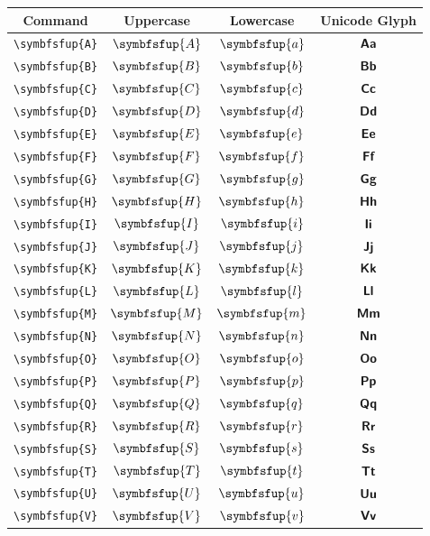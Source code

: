 \documentclass[12pt,a4paper]{article}
\begin{document}
\begin{longtable}{|c|c|c|c|}
\hline
\textbf{Command} & \textbf{Uppercase} & \textbf{Lowercase} & \textbf{Unicode Glyph} \\
\hline
\verb|\symbfsfup{A}| & $\symbfsfup{A}$ & $\symbfsfup{a}$ & $ 𝗔 𝗮 $ \\
\verb|\symbfsfup{B}| & $\symbfsfup{B}$ & $\symbfsfup{b}$ & $ 𝗕 𝗯 $ \\
\verb|\symbfsfup{C}| & $\symbfsfup{C}$ & $\symbfsfup{c}$ & $ 𝗖 𝗰 $ \\
\verb|\symbfsfup{D}| & $\symbfsfup{D}$ & $\symbfsfup{d}$ & $ 𝗗 𝗱 $ \\
\verb|\symbfsfup{E}| & $\symbfsfup{E}$ & $\symbfsfup{e}$ & $ 𝗘 𝗲 $ \\
\verb|\symbfsfup{F}| & $\symbfsfup{F}$ & $\symbfsfup{f}$ & $ 𝗙 𝗳 $ \\
\verb|\symbfsfup{G}| & $\symbfsfup{G}$ & $\symbfsfup{g}$ & $ 𝗚 𝗴 $ \\
\verb|\symbfsfup{H}| & $\symbfsfup{H}$ & $\symbfsfup{h}$ & $ 𝗛 𝗵 $ \\
\verb|\symbfsfup{I}| & $\symbfsfup{I}$ & $\symbfsfup{i}$ & $ 𝗜 𝗶 $ \\
\verb|\symbfsfup{J}| & $\symbfsfup{J}$ & $\symbfsfup{j}$ & $ 𝗝 𝗷 $ \\
\verb|\symbfsfup{K}| & $\symbfsfup{K}$ & $\symbfsfup{k}$ & $ 𝗞 𝗸 $ \\
\verb|\symbfsfup{L}| & $\symbfsfup{L}$ & $\symbfsfup{l}$ & $ 𝗟 𝗹 $ \\
\verb|\symbfsfup{M}| & $\symbfsfup{M}$ & $\symbfsfup{m}$ & $ 𝗠 𝗺 $ \\
\verb|\symbfsfup{N}| & $\symbfsfup{N}$ & $\symbfsfup{n}$ & $ 𝗡 𝗻 $ \\
\verb|\symbfsfup{O}| & $\symbfsfup{O}$ & $\symbfsfup{o}$ & $ 𝗢 𝗼 $ \\
\verb|\symbfsfup{P}| & $\symbfsfup{P}$ & $\symbfsfup{p}$ & $ 𝗣 𝗽 $ \\
\verb|\symbfsfup{Q}| & $\symbfsfup{Q}$ & $\symbfsfup{q}$ & $ 𝗤 𝗾 $ \\
\verb|\symbfsfup{R}| & $\symbfsfup{R}$ & $\symbfsfup{r}$ & $ 𝗥 𝗿 $ \\
\verb|\symbfsfup{S}| & $\symbfsfup{S}$ & $\symbfsfup{s}$ & $ 𝗦 𝘀 $ \\
\verb|\symbfsfup{T}| & $\symbfsfup{T}$ & $\symbfsfup{t}$ & $ 𝗧 𝘁 $ \\
\verb|\symbfsfup{U}| & $\symbfsfup{U}$ & $\symbfsfup{u}$ & $ 𝗨 𝘂 $ \\
\verb|\symbfsfup{V}| & $\symbfsfup{V}$ & $\symbfsfup{v}$ & $ 𝗩 𝘃 $ \\

\end{longtable}
\end{document}
